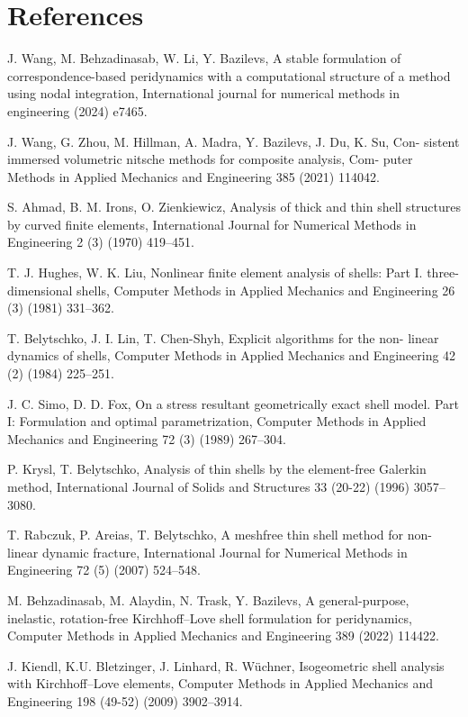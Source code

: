 \documentclass{article}
\begin{document}
\section*{References}
\begin{enumerate}[{[1]}]
    \item J. Wang, M. Behzadinasab, W. Li, Y. Bazilevs, A stable formulation of correspondence-based peridynamics with a computational structure of a method using nodal integration, International journal for numerical methods in engineering (2024) e7465. 
    \item J. Wang, G. Zhou, M. Hillman, A. Madra, Y. Bazilevs, J. Du, K. Su, Con- sistent immersed volumetric nitsche methods for composite analysis, Com- puter Methods in Applied Mechanics and Engineering 385 (2021) 114042. 
    \item S. Ahmad, B. M. Irons, O. Zienkiewicz, Analysis of thick and thin shell structures by curved finite elements, International Journal for Numerical Methods in Engineering 2 (3) (1970) 419–451. 
    \item T. J. Hughes, W. K. Liu, Nonlinear finite element analysis of shells: Part I. three-dimensional shells, Computer Methods in Applied Mechanics and Engineering 26 (3) (1981) 331–362. 
    \item T. Belytschko, J. I. Lin, T. Chen-Shyh, Explicit algorithms for the non- linear dynamics of shells, Computer Methods in Applied Mechanics and Engineering 42 (2) (1984) 225–251.
    \item J. C. Simo, D. D. Fox, On a stress resultant geometrically exact shell model. Part I: Formulation and optimal parametrization, Computer Methods in Applied Mechanics and Engineering 72 (3) (1989) 267–304.
    \item P. Krysl, T. Belytschko, Analysis of thin shells by the element-free Galerkin method, International Journal of Solids and Structures 33 (20-22) (1996) 3057–3080.
    \item T. Rabczuk, P. Areias, T. Belytschko, A meshfree thin shell method for non-linear dynamic fracture, International Journal for Numerical Methods in Engineering 72 (5) (2007) 524–548.
    \item M. Behzadinasab, M. Alaydin, N. Trask, Y. Bazilevs, A general-purpose, inelastic, rotation-free Kirchhoff–Love shell formulation for peridynamics, Computer Methods in Applied Mechanics and Engineering 389 (2022) 114422.
    \item J. Kiendl, K.U. Bletzinger, J. Linhard, R. Wüchner, Isogeometric shell analysis with Kirchhoff–Love elements, Computer Methods in Applied Mechanics and Engineering 198 (49-52) (2009) 3902–3914.
\end{enumerate}
\end{document}
